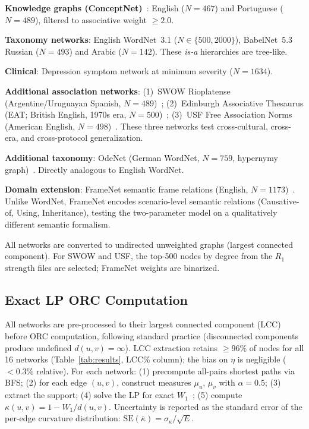\documentclass[11pt,a4paper]{article}
\newcommand{\kbar}{\bar{\kappa}}
\begin{document}
\textbf{Knowledge graphs (ConceptNet)}~\cite{speer2017conceptnet}: English ($N=467$) and Portuguese ($N=489$), filtered to associative weight $\geq 2.0$.

\textbf{Taxonomy networks}: English WordNet~3.1 ($N \in \{500, 2000\}$), BabelNet~5.3 Russian ($N=493$) and Arabic ($N=142$). These \emph{is-a} hierarchies are tree-like.

\textbf{Clinical}: Depression symptom network at minimum severity ($N=1634$).

\textbf{Additional association networks}: (1)~SWOW Rioplatense (Argentine/Uruguayan Spanish, $N=489$)~\cite{cabana2024swowrp}; (2)~Edinburgh Associative Thesaurus (EAT; British English, 1970s era, $N=500$)~\cite{kiss1973associative}; (3)~USF Free Association Norms (American English, $N=498$)~\cite{nelson1998usf}. These three networks test cross-cultural, cross-era, and cross-protocol generalization.

\textbf{Additional taxonomy}: OdeNet (German WordNet, $N=759$, hypernymy graph)~\cite{odenet2020}. Directly analogous to English WordNet.

\textbf{Domain extension}: FrameNet semantic frame relations (English, $N=1173$)~\cite{baker1998framenet}. Unlike WordNet, FrameNet encodes scenario-level semantic relations (Causative-of, Using, Inheritance), testing the two-parameter model on a qualitatively different semantic formalism.

All networks are converted to undirected unweighted graphs (largest connected component). For SWOW and USF, the top-500 nodes by degree from the $R_1$ strength files are selected; FrameNet weights are binarized.

\subsection{Exact LP ORC Computation}

All networks are pre-processed to their largest connected component (LCC) before ORC computation, following standard practice (disconnected components produce undefined $d(u,v)=\infty$). LCC extraction retains $\geq\!96\%$ of nodes for all 16 networks (Table~\ref{tab:results}, LCC\% column); the bias on $\eta$ is negligible ($<\!0.3\%$ relative). For each network: (1) precompute all-pairs shortest paths via BFS; (2) for each edge $(u,v)$, construct measures $\mu_u$, $\mu_v$ with $\alpha=0.5$; (3) extract the support; (4) solve the LP for exact $W_1$~\cite{dunning2017jump,huber2024highs}; (5) compute $\kappa(u,v) = 1 - W_1/d(u,v)$. Uncertainty is reported as the standard error of the per-edge curvature distribution: $\mathrm{SE}(\kbar) = \sigma_\kappa/\sqrt{E}$.
\end{document}
